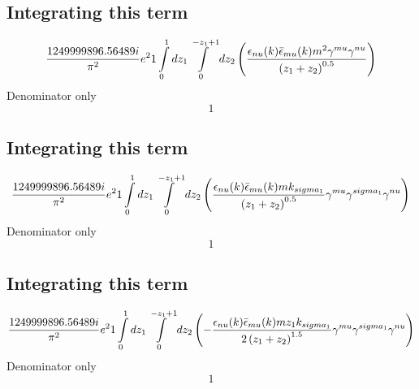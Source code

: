 \subsection*{Integrating this term}
\begin{dmath}\frac{1249999896.56489 i}{\pi^{2}} e^{2}1\int\limits_{ 0 }^{ 1 } d{ z_{ 1 } }\int\limits_{ 0 }^{ - { z_{ 1 } } + 1 } d{ z_{ 2 } }\left(\frac{\epsilon_{ \\nu }({ k }) \bar{\epsilon}_{ \\mu }({ k }) m^{2} { \gamma^{ \\mu } } { \gamma^{ \\nu } }}{\left({ z_{ 1 } } + { z_{ 2 } }\right)^{0.5}}\right)\end{dmath}
Denominator only
\begin{dmath}1\end{dmath}
\subsection*{Integrating this term}
\begin{dmath}\frac{1249999896.56489 i}{\pi^{2}} e^{2}1\int\limits_{ 0 }^{ 1 } d{ z_{ 1 } }\int\limits_{ 0 }^{ - { z_{ 1 } } + 1 } d{ z_{ 2 } }\left(\frac{\epsilon_{ \\nu }({ k }) \bar{\epsilon}_{ \\mu }({ k }) m { { k }_{ \\sigma_1 } }}{\left({ z_{ 1 } } + { z_{ 2 } }\right)^{0.5}} { \gamma^{ \\mu } } { \gamma^{ \\sigma_1 } } { \gamma^{ \\nu } }\right)\end{dmath}
Denominator only
\begin{dmath}1\end{dmath}
\subsection*{Integrating this term}
\begin{dmath}\frac{1249999896.56489 i}{\pi^{2}} e^{2}1\int\limits_{ 0 }^{ 1 } d{ z_{ 1 } }\int\limits_{ 0 }^{ - { z_{ 1 } } + 1 } d{ z_{ 2 } }\left(- \frac{\epsilon_{ \\nu }({ k }) \bar{\epsilon}_{ \\mu }({ k }) m { z_{ 1 } } { { k }_{ \\sigma_1 } }}{2 \left({ z_{ 1 } } + { z_{ 2 } }\right)^{1.5}} { \gamma^{ \\mu } } { \gamma^{ \\sigma_1 } } { \gamma^{ \\nu } }\right)\end{dmath}
Denominator only
\begin{dmath}1\end{dmath}
